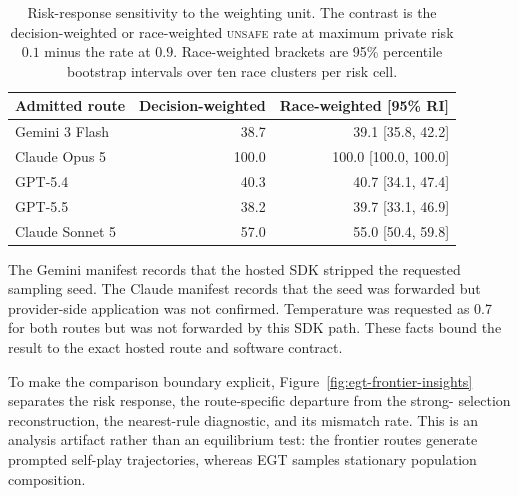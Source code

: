 \documentclass{article}
\newcommand{\Unsafe}{\textsc{unsafe}}
\begin{document}
\begin{table}[h]
    \caption{Risk-response sensitivity to the weighting unit. The contrast is
    the decision-weighted or race-weighted \Unsafe{} rate at maximum private
    risk $0.1$ minus the rate at $0.9$. Race-weighted brackets are 95\%
    percentile bootstrap intervals over ten race clusters per risk cell.}
    \label{tab:baseline-race-sensitivity}
    \centering
    \scriptsize
    \begin{tabular}{@{}lrr@{}}
        \toprule
        Admitted route & Decision-weighted & Race-weighted [95\% RI] \\
        \midrule
        Gemini 3 Flash & 38.7 & 39.1 [35.8, 42.2] \\
        Claude Opus 5 & 100.0 & 100.0 [100.0, 100.0] \\
        GPT-5.4 & 40.3 & 40.7 [34.1, 47.4] \\
        GPT-5.5 & 38.2 & 39.7 [33.1, 46.9] \\
        Claude Sonnet 5 & 57.0 & 55.0 [50.4, 59.8] \\
        \bottomrule
    \end{tabular}
\end{table}

The Gemini manifest records that the hosted SDK stripped the requested
sampling seed. The Claude manifest records that the seed was forwarded but
provider-side application was not confirmed. Temperature was requested as
0.7 for both routes but was not forwarded by this SDK path. These facts bound
the result to the exact hosted route and software contract.

To make the comparison boundary explicit, Figure~\ref{fig:egt-frontier-insights}
separates the risk response, the route-specific departure from the strong-
selection reconstruction, the nearest-rule diagnostic, and its mismatch
rate. This is an analysis artifact rather than an equilibrium test: the
frontier routes generate prompted self-play trajectories, whereas EGT samples
stationary population composition.
\end{document}

